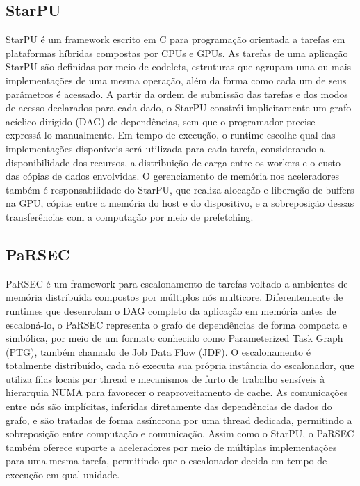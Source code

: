 \documentclass[12pt]{article}
\begin{document}
\subsection{StarPU}

StarPU \cite{starpu} é um framework escrito em C para programação orientada a tarefas em plataformas híbridas compostas por CPUs e GPUs. As tarefas de uma aplicação StarPU são definidas por meio de codelets, estruturas que agrupam uma ou mais implementações de uma mesma operação, além da forma como cada um de seus parâmetros é acessado. A partir da ordem de submissão das tarefas e dos modos de acesso declarados para cada dado, o StarPU constrói implicitamente um grafo acíclico dirigido (DAG) de dependências, sem que o programador precise expressá-lo manualmente. Em tempo de execução, o runtime escolhe qual das implementações disponíveis será utilizada para cada tarefa, considerando a disponibilidade dos recursos, a distribuição de carga entre os workers e o custo das cópias de dados envolvidas. O gerenciamento de memória nos aceleradores também é responsabilidade do StarPU, que realiza alocação e liberação de buffers na GPU, cópias entre a memória do host e do dispositivo, e a sobreposição dessas transferências com a computação por meio de prefetching.

\subsection{PaRSEC}

PaRSEC \cite{bosilca2011dague} é um framework para escalonamento de tarefas voltado a ambientes de memória distribuída compostos por múltiplos nós multicore. Diferentemente de runtimes que desenrolam o DAG completo da aplicação em memória antes de escaloná-lo, o PaRSEC representa o grafo de dependências de forma compacta e simbólica, por meio de um formato conhecido como Parameterized Task Graph (PTG), também chamado de Job Data Flow (JDF). O escalonamento é totalmente distribuído, cada nó executa sua própria instância do escalonador, que utiliza filas locais por thread e mecanismos de furto de trabalho sensíveis à hierarquia NUMA para favorecer o reaproveitamento de cache. As comunicações entre nós são implícitas, inferidas diretamente das dependências de dados do grafo, e são tratadas de forma assíncrona por uma thread dedicada, permitindo a sobreposição entre computação e comunicação. Assim como o StarPU, o PaRSEC também oferece suporte a aceleradores por meio de múltiplas implementações para uma mesma tarefa, permitindo que o escalonador decida em tempo de execução em qual unidade.
\end{document}
